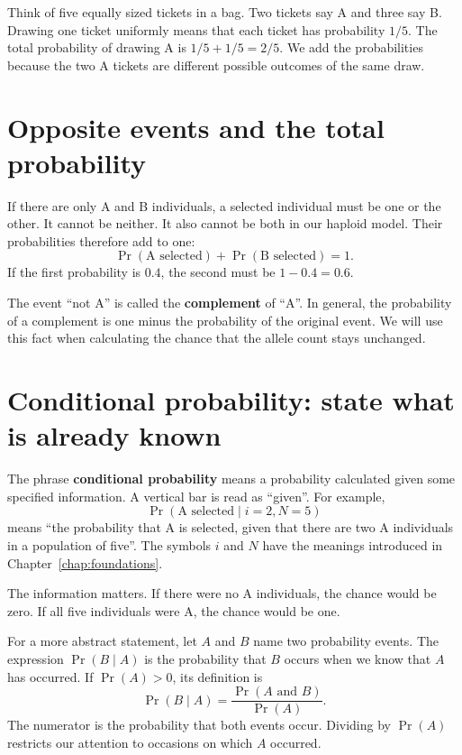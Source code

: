 \begin{workedexample}
Think of five equally sized tickets in a bag. Two tickets say A and three
say B. Drawing one ticket uniformly means that each ticket has probability
\(1/5\). The total probability of drawing A is
\(1/5+1/5=2/5\). We add the probabilities because the two A tickets are
different possible outcomes of the same draw.
\end{workedexample}

\section{Opposite events and the total probability}

If there are only A and B individuals, a selected individual must be one
or the other. It cannot be neither. It also cannot be both in our haploid
model. Their probabilities therefore add to one:
\[
 \Pr(\text{A selected})+\Pr(\text{B selected})=1.
\]
If the first probability is \(0.4\), the second must be \(1-0.4=0.6\).

The event ``not A'' is called the \textbf{complement} of ``A''. In general,
the probability of a complement is one minus the probability of the original
event. We will use this fact when calculating the chance that the allele
count stays unchanged.

\section{Conditional probability: state what is already known}

The phrase \textbf{conditional probability} means a probability calculated
given some specified information. A vertical bar is read as ``given''.
For example,
\[
 \Pr(\text{A selected}\mid i=2,N=5)
\]
means ``the probability that A is selected, given that there are two A
individuals in a population of five''. The symbols \(i\) and \(N\) have
the meanings introduced in Chapter~\ref{chap:foundations}.

The information matters. If there were no A individuals, the chance would
be zero. If all five individuals were A, the chance would be one.

For a more abstract statement, let \(A\) and \(B\) name two probability
events. The expression \(\Pr(B\mid A)\) is the probability that \(B\)
occurs when we know that \(A\) has occurred. If \(\Pr(A)>0\), its definition is
\[
  \Pr(B\mid A)=\frac{\Pr(A\text{ and }B)}{\Pr(A)}.
\]
The numerator is the probability that both events occur. Dividing by
\(\Pr(A)\) restricts our attention to occasions on which \(A\) occurred.

